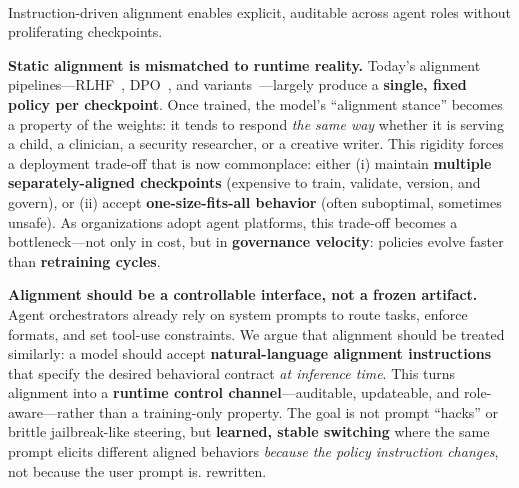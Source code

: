\ThinRule


\vspace{0.4mm}
\ThinRule
\\
\noindent{}
Instruction-driven alignment enables explicit, auditable  across agent roles without proliferating checkpoints.






\textbf{Static alignment is mismatched to runtime reality.}
Today’s alignment pipelines---RLHF~\cite{ouyang2022training,stiennon2020learning}, DPO~\cite{rafailov2023direct}, and variants~\cite{azar2023general,ethayarajh2024kto}---largely produce a \textbf{single, fixed policy per checkpoint}.
Once trained, the model’s ``alignment stance'' becomes a property of the weights: it tends to respond \emph{the same way} whether it is serving a child, a clinician, a security researcher, or a creative writer.
This rigidity forces a deployment trade-off that is now commonplace:
either (i) maintain \textbf{multiple separately-aligned checkpoints} (expensive to train, validate, version, and govern), or (ii) accept \textbf{one-size-fits-all behavior} (often suboptimal, sometimes unsafe).
As organizations adopt agent platforms, this trade-off becomes a bottleneck---not only in cost, but in \textbf{governance velocity}: policies evolve faster than \textbf{retraining cycles}.

 

\textbf{Alignment should be a controllable interface, not a frozen artifact.}
Agent orchestrators already rely on system prompts to route tasks, enforce formats, and set tool-use constraints.
We argue that alignment should be treated similarly: a model should accept \textbf{natural-language alignment instructions} that specify the desired behavioral contract \emph{at inference time}.
This turns alignment into a \textbf{runtime control channel}---auditable, updateable, and role-aware---rather than a training-only property.
The goal is not prompt ``hacks'' or brittle jailbreak-like steering, but \textbf{learned, stable switching} where the same prompt elicits different aligned behaviors \emph{because the policy instruction changes}, not because the user prompt is.
rewritten. 


